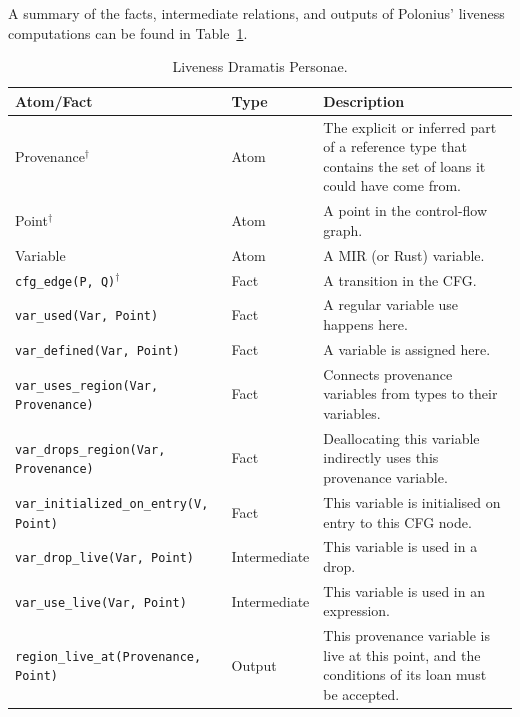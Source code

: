 \documentclass[11pt,a4paper,twoside,openany,draft]{report}
\newcommand{\notmine}[0] {$^\dagger$}
\newcommand{\InDatalog}[1]{\texttt{#1}}
\begin{document}
A summary of the facts, intermediate relations, and outputs of Polonius'
liveness computations can be found in Table~\ref{tab:liveness-facts-recap}.

{ \renewcommand{\arraystretch}{1.0}
\begin{table}[!htbp]
  \begin{tabular}{@{}l l m{5.5cm}}
    Atom/Fact & Type & Description \\ \toprule
    Provenance\notmine{} & Atom & The explicit or inferred part of a reference type that contains the set of loans it could have come from.  \\
    Point\notmine{} & Atom & A point in the control-flow graph. \\
    Variable & Atom & A MIR (or Rust) variable. \\
    \InDatalog{cfg_edge(P, Q)}\notmine{} & Fact & A transition in the CFG\@. \\
    \InDatalog{var_used(Var, Point)} & Fact & A regular variable use happens here.\\
    \InDatalog{var_defined(Var, Point)} & Fact & A variable is assigned here.\\
    \InDatalog{var_uses_region(Var, Provenance)} & Fact & Connects provenance variables from types to their variables.\\
    \InDatalog{var_drops_region(Var, Provenance)} & Fact & Deallocating this variable indirectly uses this provenance variable. \\
    \InDatalog{var_initialized_on_entry(V, Point)} & Fact & This variable is initialised on entry to this CFG node. \\
    \InDatalog{var_drop_live(Var, Point)} & Intermediate & This variable is used in a drop. \\
    \InDatalog{var_use_live(Var, Point)} & Intermediate & This variable is used in an expression. \\
    \InDatalog{region_live_at(Provenance, Point)} & Output & This provenance variable is live at this point, and the conditions of its loan must be accepted. \\
  \end{tabular}
\caption[Liveness Dramatis Personae]{Liveness Dramatis Personae.}\label{tab:liveness-facts-recap}
\end{table}%
}
\end{document}
